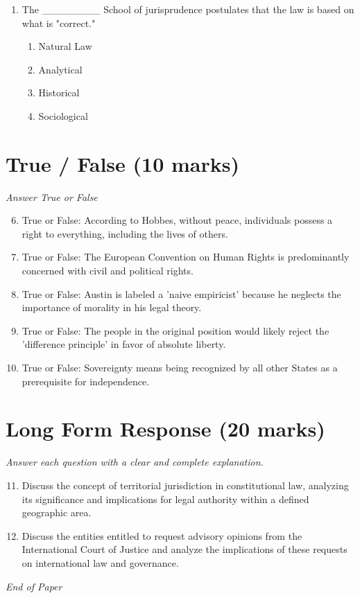 \documentclass[12pt]{article}
\begin{document}
\begin{enumerate}[label=\arabic*.]
\begin{enumerate}[label=(\alph*)]
    \item Codification ossifies the law.
    \item Bentham fails to take account of the criminal law.
    \item Significant portions of the law are already codified.
\end{enumerate}
\item The \_\_\_\_\_\_\_\_ School of jurisprudence postulates that the law is based on what is "correct."
\begin{enumerate}[label=(\alph*)]
    \item Natural Law
    \item Analytical
    \item Historical
    \item Sociological
\end{enumerate}
\end{enumerate}

\section*{True / False (10 marks)}
\textit{Answer True or False}
\begin{enumerate}[label=\arabic*.]
\setcounter{enumi}{5}
\item True or False: According to Hobbes, without peace, individuals possess a right to everything, including the lives of others.
\item True or False: The European Convention on Human Rights is predominantly concerned with civil and political rights.
\item True or False: Austin is labeled a 'naive empiricist' because he neglects the importance of morality in his legal theory.
\item True or False: The people in the original position would likely reject the 'difference principle' in favor of absolute liberty.
\item True or False: Sovereignty means being recognized by all other States as a prerequisite for independence.
\end{enumerate}

\section*{Long Form Response (20 marks)}
\textit{Answer each question with a clear and complete explanation.}
\begin{enumerate}[label=\arabic*.]
\setcounter{enumi}{10}
\item Discuss the concept of territorial jurisdiction in constitutional law, analyzing its significance and implications for legal authority within a defined geographic area.
\item Discuss the entities entitled to request advisory opinions from the International Court of Justice and analyze the implications of these requests on international law and governance.
\end{enumerate}

\vfill
\noindent\textit{End of Paper}
\end{document}
